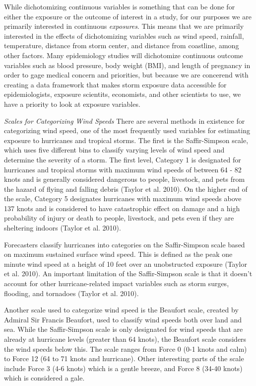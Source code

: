 \documentclass[]{article}
\begin{document}
While dichotomizing continuous variables is something that can be done
for either the exposure or the outcome of interest in a study, for our
purposes we are primarily interested in continuous \emph{exposures}.
This means that we are primarily interested in the effects of
dichotomizing variables such as wind speed, rainfall, temperature,
distance from storm center, and distance from coastline, among other
factors. Many epidemiology studies will dichotomize continuous outcome
variables such as blood pressure, body weight (BMI), and length of
pregnancy in order to gage medical concern and priorities, but because
we are concerend with creating a data framework that makes storm
exposure data accessible for epidemiologists, exposure scientits,
economists, and other scientists to use, we have a priority to look at
exposure variables.

\emph{Scales for Categorizing Wind Speeds} There are several methods in
existence for categorizing wind speed, one of the most frequently used
variables for estimating exposure to hurricanes and tropical storms. The
first is the Saffir-Simpson scale, which uses five different bins to
classify varying levels of wind speed and determine the severity of a
storm. The first level, Category 1 is designated for hurricanes and
tropical storms with maximum wind speeds of between 64 - 82 knots and is
generally considered dangerous to people, livestock, and pets from the
hazard of flying and falling debris (Taylor et al. 2010). On the higher
end of the scale, Category 5 designates hurricanes with maximum wind
speeds above 137 knots and is considered to have catastrophic effect on
damage and a high probability of injury or death to people, livestock,
and pets even if they are sheltering indoors (Taylor et al. 2010).

Forecasters classify hurricanes into categories on the Saffir-Simpson
scale based on maximum sustained surface wind speed. This is defined as
the peak one minute wind speed at a height of 10 feet over an
unobstructed exposure (Taylor et al. 2010). An important limitation of
the Saffir-Simpson scale is that it doesn't account for other
hurricane-related impact variables such as storm surges, flooding, and
tornadoes (Taylor et al. 2010).

Another scale used to categorize wind speed is the Beaufort scale,
created by Admiral Sir Francis Beaufort, used to classify wind speeds
both over land and sea. While the Saffir-Simpson scale is only
designated for wind speeds that are already at hurricane levels (greater
than 64 knots), the Beaufort scale considers the wind speeds below this.
The scale ranges from Force 0 (0-1 knots and calm) to Force 12 (64 to 71
knots and hurricane). Other interesting parts of the scale include Force
3 (4-6 knots) which is a gentle breeze, and Force 8 (34-40 knots) which
is considered a gale.
\end{document}
